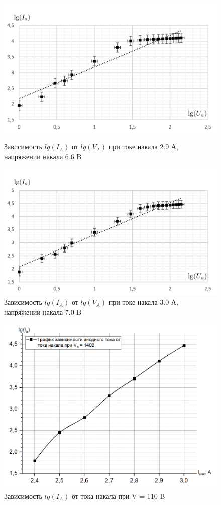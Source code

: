 \documentclass[a4paper]{article}
\begin{document}
\begin{figure}[h]
\begin{center}
\begin{minipage}[h]{0.45\linewidth}
\includegraphics[width=1\linewidth]{2_9.png}
\caption{Зависимость $lg(I_A)$ от $lg(V_A)$ при токе накала 2.9 А, напряжении накала 6.6 B}
\end{minipage}
\hfill 
\begin{minipage}[h]{0.45\linewidth}
\includegraphics[width=1\linewidth]{3_0.png}
\caption{Зависимость $lg(I_A)$ от $lg(V_A)$ при токе накала 3.0 А, напряжении накала 7.0 B }
\end{minipage}
\end{center}
\end{figure}

\begin{figure}[h]
\begin{center}
\includegraphics[width=13cm]{fig4.png}
\caption{Зависимость $lg(I_A)$ от тока накала при V = 110 B}
\end{center}
\end{figure}
\end{document}
